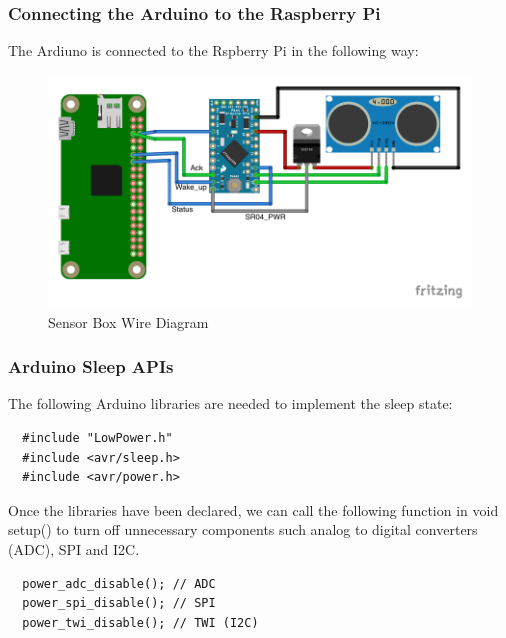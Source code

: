 \documentclass[paper=a4, fontsize=12pt]{scrartcl}
\numberwithin{equation}{section}		%
\numberwithin{figure}{section}			%
\numberwithin{table}{section}				%
\begin{document}

\subsubsection{Connecting the Arduino to the Raspberry Pi}

The Ardiuno is connected to the Rspberry Pi in the following way:

\begin{center}
\begin{figure}[H]
\centering
\includegraphics[width=5.1in]{hardware/Wire_Diagram_bb.pdf}
\caption{Sensor Box Wire Diagram}
\end{figure}
\end{center}

\subsubsection{Arduino Sleep APIs}
The following Arduino libraries are needed to implement the sleep state:
\begin{verbatim}
  #include "LowPower.h"
  #include <avr/sleep.h>
  #include <avr/power.h>
\end{verbatim}

Once the libraries have been declared, we can call the following function in void setup() to turn off unnecessary components such analog to digital converters (ADC), SPI and I2C. 

\begin{verbatim}
  power_adc_disable(); // ADC
  power_spi_disable(); // SPI
  power_twi_disable(); // TWI (I2C)   
\end{verbatim}
\end{document}
